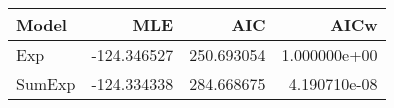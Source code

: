 \begin{tabular}{lrrr}
\toprule
  Model &         MLE &         AIC &          AICw \\
\midrule
    Exp & -124.346527 &  250.693054 &  1.000000e+00 \\
 SumExp & -124.334338 &  284.668675 &  4.190710e-08 \\
\bottomrule
\end{tabular}

